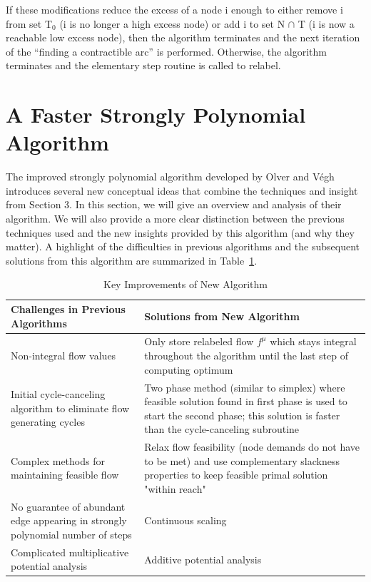 \documentclass[11pt]{article}
\theoremstyle{definition}
\theoremstyle{definition}
\begin{document}
	If these modifications reduce the excess of a node i enough to either remove i from set T$_0$ (i is no longer a high excess node) or add i to set N $\cap$ T (i is now a reachable low excess node), then the algorithm terminates and the next iteration of the ``finding a contractible arc'' is performed. Otherwise, the algorithm terminates and the elementary step routine is called to relabel.

\section{A Faster Strongly Polynomial Algorithm}
The improved strongly polynomial algorithm developed by Olver and Végh \cite{Olver2017}
introduces several new conceptual ideas that combine the techniques and insight from Section 3.
In this section, we will give an overview and analysis of their algorithm. We will also
provide a more clear distinction between the previous techniques used and the new insights
provided by this algorithm (and why they matter). A highlight of the difficulties in
previous algorithms and the subsequent solutions from this algorithm are
summarized in Table~\ref{tab:improvements}.

\begin{table}[H]
\begin{center}
    \begin{tabular}{ | p{7cm} | p{7cm} |}
    \hline
    Challenges in Previous Algorithms  & Solutions from New Algorithm \\ \hline
    Non-integral flow values & Only store relabeled flow $f^{\mu}$ which stays integral throughout the algorithm until the last step of computing optimum \\ \hline
    Initial cycle-canceling algorithm to eliminate flow generating cycles & Two phase method (similar to simplex) where feasible solution found in first phase is used to start the second phase; this solution is faster than the cycle-canceling subroutine \\ \hline
    Complex methods for maintaining feasible flow & Relax flow feasibility (node demands do not have to be met) and use complementary slackness properties to keep feasible primal solution "within reach" \\ \hline
    No guarantee of abundant edge appearing in strongly polynomial number of steps \cite{Radzik2004} &  Continuous scaling\\ \hline
    Complicated multiplicative potential analysis \cite{Vegh2013} & Additive potential analysis \\
    \hline
    \end{tabular}
\end{center}
\caption{Key Improvements of New Algorithm}
\label{tab:improvements}
\end{table}
\end{document}
